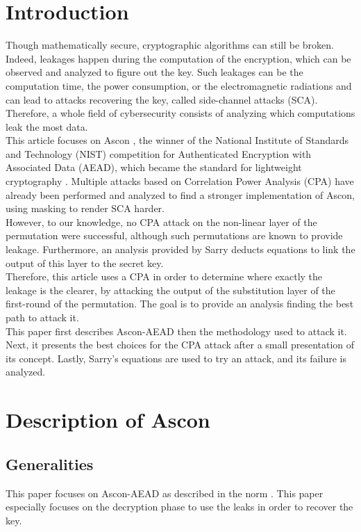 \documentclass[11pt,technote]{IEEEtran}
\begin{document}
		\section{Introduction}
		Though mathematically secure, cryptographic algorithms can still be broken. Indeed, leakages happen during the computation of the encryption, which can be observed and analyzed to figure out the key. Such leakages can be the computation time, the power consumption, or the electromagnetic radiations and can lead to attacks recovering the key, called side-channel attacks (SCA). Therefore, a whole field of cybersecurity consists of analyzing which computations leak the most data.\\
		This article focuses on Ascon \cite{ascon}, the winner of the National Institute of Standards and Technology (NIST) competition for Authenticated Encryption with Associated Data (AEAD), which became the standard for lightweight cryptography \cite{norme}. Multiple attacks \cite{cpa_lin,dl_cpa} based on Correlation Power Analysis (CPA) \cite{cpa_aes} have already been performed and analyzed \cite{cpa_analysis} to find a stronger implementation of Ascon, using masking to render SCA harder.\\
		However, to our knowledge, no CPA attack on the non-linear layer of the permutation were successful, although such permutations are known to provide leakage. Furthermore, an analysis provided by Sarry\cite{these} deducts equations to link the output of this layer to the secret key.\\
		Therefore, this article uses a CPA in order to determine where exactly the leakage is the clearer, by attacking the output of the substitution layer of the first-round of the permutation. The goal is to provide an analysis finding the best path to attack it.\\
		This paper first describes Ascon-AEAD then the methodology used to attack it. Next, it presents the best choices for the CPA attack after a small presentation of its concept. Lastly, Sarry's equations \cite{these} are used to try an attack, and its failure is analyzed.
		
		\section{Description of Ascon}
		\subsection{Generalities}
		This paper focuses on Ascon-AEAD as described in the norm \cite{norme}. This paper especially focuses on the decryption phase to use the leaks in order to recover the key.
		
\end{document}
